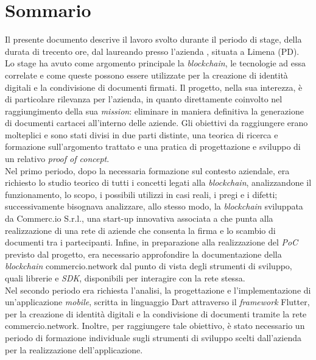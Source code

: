 
\cleardoublepage
{}
{}
\begingroup
\let\clearpage\relax
\let\cleardoublepage\relax
\let\cleardoublepage\relax

\chapter*{Sommario}

Il presente documento descrive il lavoro svolto durante il periodo di stage, della durata di trecento ore, dal laureando \myName{} presso l'azienda \myCompany{} \companyTitle{}, situata a Limena (PD).\\
Lo stage ha avuto come argomento principale la \textit{blockchain}, le tecnologie ad essa correlate e come queste possono essere utilizzate per la creazione di identità digitali e la condivisione di documenti firmati. Il progetto, nella sua interezza, è di particolare rilevanza per l'azienda, in quanto direttamente coinvolto nel raggiungimento della sua \textit{mission}: eliminare in maniera definitiva la generazione di documenti cartacei all'interno delle aziende.
Gli obiettivi da raggiungere erano molteplici e sono stati divisi in due parti distinte, una teorica di ricerca e formazione sull'argomento trattato e una pratica di progettazione e sviluppo di un relativo \textit{proof of concept}.\\
Nel primo periodo, dopo la necessaria formazione sul contesto aziendale, era richiesto lo studio teorico di tutti i concetti legati alla \textit{blockchain}, analizzandone il funzionamento, lo scopo, i possibili utilizzi in casi reali, i pregi e i difetti; successivamente bisognava analizzare, allo stesso modo, la \textit{blockchain} sviluppata da Commerc.io S.r.l., una start-up innovativa associata a \myCompany{} che punta alla realizzazione di una rete di aziende che consenta la firma e lo scambio di documenti tra i partecipanti. Infine, in preparazione alla realizzazione del \textit{PoC} previsto dal progetto, era necessario approfondire la documentazione della \textit{blockchain} commercio.network dal punto di vista degli strumenti di sviluppo, quali librerie e \textit{SDK}, disponibili per interagire con la rete stessa.\\
Nel secondo periodo era richiesta l'analisi, la progettazione e l'implementazione di un'applicazione \textit{mobile}, scritta  in linguaggio Dart attraverso il \textit{framework} Flutter, per la creazione di identità digitali e la condivisione di documenti tramite la rete commercio.network. Inoltre, per raggiungere tale obiettivo, è stato necessario un periodo di formazione individuale sugli strumenti di sviluppo scelti dall'azienda per la realizzazione dell'applicazione.

%
%

\endgroup			

\vfill

